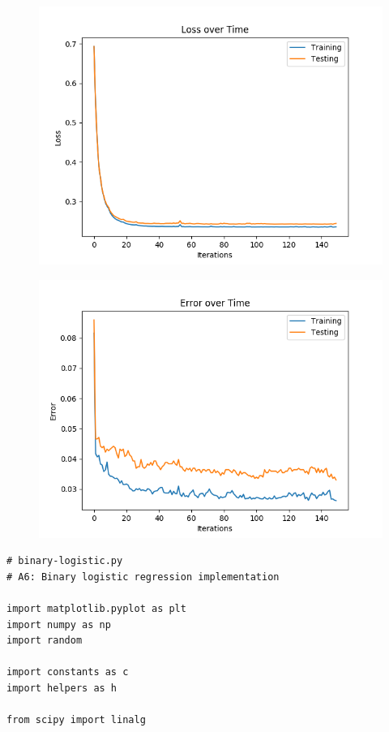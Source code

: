 \documentclass{article}
\newcommand{\1}{\mathbf{1}}
\begin{document}
{\begin{figure}[ht]
  \centering
  \includegraphics[width=120mm]{../hw2-code/results/a6_di.png}
\end{figure}

\begin{figure}[h]
  \centering
  \includegraphics[width=120mm]{../hw2-code/results/a6_dii.png}
\end{figure}

\newpage

\begin{verbatim}
# binary-logistic.py
# A6: Binary logistic regression implementation

import matplotlib.pyplot as plt
import numpy as np
import random

import constants as c
import helpers as h

from scipy import linalg


\end{verbatim}}
\end{document}
